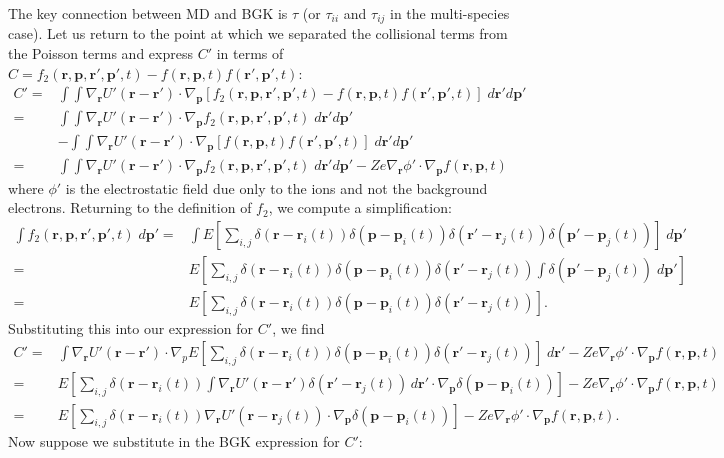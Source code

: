 \documentclass{article}
\begin{document}
The key connection between MD and BGK is $\tau$ (or $\tau_{ii}$ and $\tau_{ij}$ in the multi-species case). Let us return to the point at which we separated the collisional terms from the Poisson terms and express $C'$ in terms of $C=f_2(\mathbf{r},\mathbf{p},\mathbf{r}',\mathbf{p}',t)-f(\mathbf{r},\mathbf{p},t)f(\mathbf{r}',\mathbf{p}',t)$:
\begin{align*}
C'=&\int\int\nabla_\mathbf{r}U'(\mathbf{r}-\mathbf{r'})\cdot\nabla_\mathbf{p}[f_2(\mathbf{r},\mathbf{p},\mathbf{r}',\mathbf{p}',t)-f(\mathbf{r},\mathbf{p},t)f(\mathbf{r}',\mathbf{p}',t)]\;d\mathbf{r}'d\mathbf{p}'\\
=&\int\int\nabla_\mathbf{r}U'(\mathbf{r}-\mathbf{r}')\cdot\nabla_\mathbf{p}f_2(\mathbf{r},\mathbf{p},\mathbf{r}',\mathbf{p}',t)\;d\mathbf{r}'d\mathbf{p}'\\&-\int\int\nabla_\mathbf{r}U'(\mathbf{r}-\mathbf{r}')\cdot\nabla_\mathbf{p}[f(\mathbf{r},\mathbf{p},t)f(\mathbf{r}',\mathbf{p}',t)]\;d\mathbf{r}'d\mathbf{p}'\\
=&\int\int\nabla_\mathbf{r}U'(\mathbf{r}-\mathbf{r}')\cdot\nabla_\mathbf{p}f_2(\mathbf{r},\mathbf{p},\mathbf{r}',\mathbf{p}',t)\;d\mathbf{r}'d\mathbf{p}'-Ze\nabla_\mathbf{r}\phi'\cdot \nabla_\mathbf{p}f(\mathbf{r},\mathbf{p},t)
\end{align*}where $\phi'$ is the electrostatic field due only to the ions and not the background electrons. Returning to the definition of $f_2$, we compute a simplification:
\begin{align*}
\int f_2(\mathbf{r},\mathbf{p},\mathbf{r}',\mathbf{p}',t)\;d\mathbf{p}'=&\int E\left[\sum_{i,j}\delta(\mathbf{r}-\mathbf{r}_i(t))\delta(\mathbf{p}-\mathbf{p}_i(t))\delta(\mathbf{r}'-\mathbf{r}_j(t))\delta(\mathbf{p}'-\mathbf{p}_j(t))\right]\;d\mathbf{p}'\\
=&E\left[\sum_{i,j}\delta(\mathbf{r}-\mathbf{r}_i(t))\delta(\mathbf{p}-\mathbf{p}_i(t))\delta(\mathbf{r}'-\mathbf{r}_j(t))\int \delta(\mathbf{p}'-\mathbf{p}_j(t))\;d\mathbf{p}'\right]\\
=&E\left[\sum_{i,j}\delta(\mathbf{r}-\mathbf{r}_i(t))\delta(\mathbf{p}-\mathbf{p}_i(t))\delta(\mathbf{r}'-\mathbf{r}_j(t))\right].
\end{align*}Substituting this into our expression for $C'$, we find
\begin{align*}
C'=&\int\nabla_\mathbf{r}U'(\mathbf{r}-\mathbf{r}')\cdot \nabla_p E\left[\sum_{i,j}\delta(\mathbf{r}-\mathbf{r}_i(t))\delta(\mathbf{p}-\mathbf{p}_i(t))\delta(\mathbf{r}'-\mathbf{r}_j(t))\right]\;d\mathbf{r}'-Ze\nabla_\mathbf{r}\phi'\cdot \nabla_\mathbf{p}f(\mathbf{r},\mathbf{p},t)\\
=&E\left[\sum_{i,j}\delta(\mathbf{r}-\mathbf{r}_i(t))\int \nabla_\mathbf{r}U'(\mathbf{r}-\mathbf{r}')\delta(\mathbf{r}'-\mathbf{r}_j(t))\,d\mathbf{r}'\cdot\nabla_\mathbf{p}\delta(\mathbf{p}-\mathbf{p}_i(t))\right]-Ze\nabla_\mathbf{r}\phi'\cdot\nabla_\mathbf{p}f(\mathbf{r},\mathbf{p},t)\\
=&E\left[\sum_{i,j}\delta(\mathbf{r}-\mathbf{r}_i(t))\nabla_\mathbf{r}U'(\mathbf{r}-\mathbf{r}_j(t))\cdot\nabla_\mathbf{p}\delta(\mathbf{p}-\mathbf{p}_i(t))\right]-Ze\nabla_\mathbf{r}\phi'\cdot\nabla_\mathbf{p}f(\mathbf{r},\mathbf{p},t).
\end{align*}Now suppose we substitute in the BGK expression for $C'$:
\end{document}
